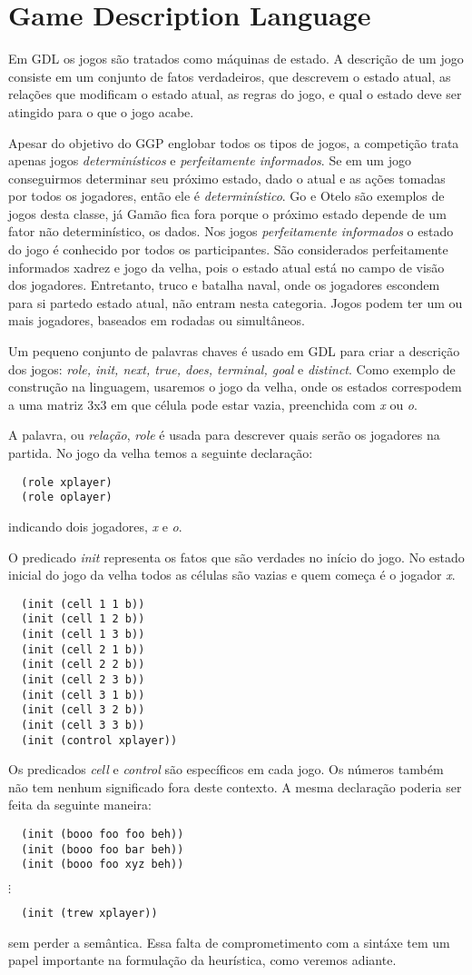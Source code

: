 \section{Game Description Language}
Em GDL os jogos são tratados como máquinas de estado. A descrição de um jogo
consiste em um conjunto de fatos verdadeiros, que descrevem o estado atual, as
relações que modificam o estado atual, as regras do jogo, e qual o estado deve
ser atingido para o que o jogo acabe.

Apesar do objetivo do GGP englobar todos os tipos de jogos, a competição trata
apenas jogos {\it determinísticos} e {\it perfeitamente informados}. Se em um
jogo conseguirmos determinar seu próximo estado, dado o atual e as ações tomadas
por todos os jogadores, então ele é {\it determinístico}. Go e Otelo são
exemplos de jogos desta classe, já Gamão fica fora porque o próximo estado
depende de um fator não determinístico, os dados. Nos jogos {\it perfeitamente informados} 
o estado do jogo é conhecido por todos os participantes. São
considerados perfeitamente informados xadrez e jogo da velha, pois o estado
atual está no campo de visão dos jogadores. Entretanto, truco e batalha naval,
onde os jogadores escondem para si partedo estado atual, não entram nesta
categoria. Jogos podem ter um ou mais jogadores, baseados em rodadas ou
simultâneos. 

Um pequeno conjunto de palavras chaves é usado em GDL para criar a descrição dos
jogos: {\it role, init, next, true, does, terminal, goal} e {\it distinct}.
Como exemplo de construção na linguagem, usaremos o jogo da velha, onde os
estados correspodem a uma matriz 3x3 em que célula pode estar vazia, preenchida
com {\it x} ou {\it o}.

A palavra, ou {\it relação}, {\it role} é usada para descrever quais serão os
jogadores na partida. No jogo da velha temos a seguinte declaração:
\begin{verbatim}
  (role xplayer)
  (role oplayer)
\end{verbatim}
indicando dois jogadores, {\it x} e {\it o}.

O predicado {\it init} representa os fatos que são verdades no início do jogo.
No estado inicial do jogo da velha todos as células são vazias e quem começa é o
jogador {\it x}.
\begin{verbatim}
  (init (cell 1 1 b))
  (init (cell 1 2 b))
  (init (cell 1 3 b))
  (init (cell 2 1 b))
  (init (cell 2 2 b))
  (init (cell 2 3 b))
  (init (cell 3 1 b))
  (init (cell 3 2 b))
  (init (cell 3 3 b))
  (init (control xplayer))
\end{verbatim}
Os predicados {\it cell} e {\it control} são específicos em cada jogo. Os
números também não tem nenhum significado fora deste contexto. A mesma
declaração poderia ser feita da seguinte maneira:
\begin{verbatim}
  (init (booo foo foo beh))
  (init (booo foo bar beh))
  (init (booo foo xyz beh))
\end{verbatim}
      $\vdots$
\begin{verbatim}
  (init (trew xplayer))
\end{verbatim}
sem perder a semântica. Essa falta de comprometimento com a sintáxe tem um papel
importante na formulação da heurística, como veremos adiante.

